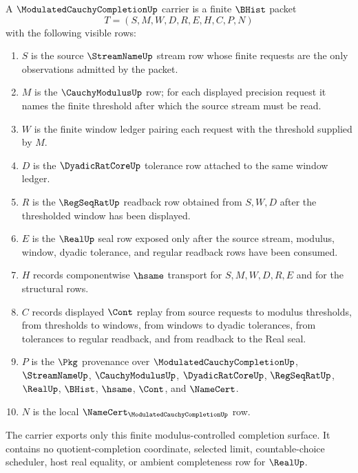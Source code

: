\begin{definition}
\label{def:modulated-cauchy-completion-carrier}
A $\ModulatedCauchyCompletionUp$ carrier is a finite $\BHist$ packet
$$
T=(S,M,W,D,R,E,H,C,P,N)
$$
with the following visible rows:
\begin{enumerate}
\item $S$ is the source $\StreamNameUp$ stream row whose finite requests are the only observations admitted by the packet.
\item $M$ is the $\CauchyModulusUp$ row; for each displayed precision request it names the finite threshold after which the source stream must be read.
\item $W$ is the finite window ledger pairing each request with the threshold supplied by $M$.
\item $D$ is the $\DyadicRatCoreUp$ tolerance row attached to the same window ledger.
\item $R$ is the $\RegSeqRatUp$ readback row obtained from $S,W,D$ after the thresholded window has been displayed.
\item $E$ is the $\RealUp$ seal row exposed only after the source stream, modulus, window, dyadic tolerance, and regular readback rows have been consumed.
\item $H$ records componentwise $\hsame$ transport for $S,M,W,D,R,E$ and for the structural rows.
\item $C$ records displayed $\Cont$ replay from source requests to modulus thresholds, from thresholds to windows, from windows to dyadic tolerances, from tolerances to regular readback, and from readback to the Real seal.
\item $P$ is the $\Pkg$ provenance over $\ModulatedCauchyCompletionUp$, $\StreamNameUp$, $\CauchyModulusUp$, $\DyadicRatCoreUp$, $\RegSeqRatUp$, $\RealUp$, $\BHist$, $\hsame$, $\Cont$, and $\NameCert$.
\item $N$ is the local $\NameCert_{\ModulatedCauchyCompletionUp}$ row.
\end{enumerate}
The carrier exports only this finite modulus-controlled completion surface. It contains no quotient-completion coordinate, selected limit, countable-choice scheduler, host real equality, or ambient completeness row for $\RealUp$.
\end{definition}

